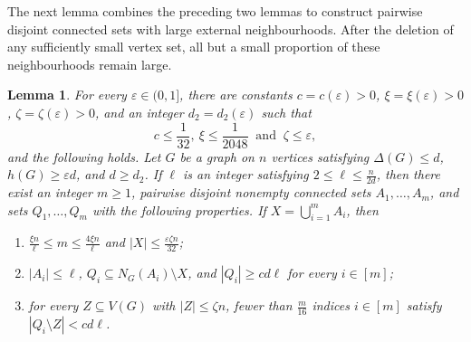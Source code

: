 \documentclass[11pt,a4paper]{article}
\newtheorem{lemma}[theorem]{Lemma}
\theoremstyle{definition}
\theoremstyle{remark}
\newcommand{\eps}{\varepsilon}
\begin{document}
The next lemma  combines the preceding two lemmas to construct pairwise disjoint connected sets with large external neighbourhoods.
After the deletion of any sufficiently small vertex set, all but a small proportion of these neighbourhoods remain large.

\begin{lemma}\label{lem:stable-branches}
For every $\eps\in(0,1]$, there are constants
$c=c(\eps)>0$, $\xi=\xi(\eps)>0$, $\zeta=\zeta(\eps)>0$, and an
integer $d_2=d_2(\eps)$ such that 
\[
c\le\frac{1}{32}, \
\xi\le\frac{1}{2048}\ \text{ and } \ \zeta\le\eps,
\]
and
the following holds. Let $G$ be a
graph on $n$ vertices satisfying $\Delta(G)\le d$,
$h(G)\ge\eps d$, and $d\ge d_2$. If $\ell$ is an integer satisfying
$2\le\ell\le\frac{n}{2d}$, then there exist an integer $m\ge1$, pairwise
disjoint nonempty connected sets $A_1,\ldots,A_m$, and sets
$Q_1,\ldots,Q_m$ with the following properties. If
$X=\bigcup_{i=1}^mA_i$, then
\begin{enumerate}[label=\textup{(\roman*)}]
 \item $\frac{\xi n}{\ell}\le m\le\frac{4\xi n}{\ell}$ and
       $|X|\le\frac{\eps\zeta n}{32}$;
 \item $|A_i|\le\ell$, $Q_i\subseteq N_G(A_i)\setminus X$, and
       $|Q_i|\ge cd\ell$ for every $i\in[m]$;
 \item for every $Z\subseteq V(G)$ with $|Z|\le\zeta n$, fewer than
       $\frac{m}{16}$ indices $i\in[m]$ satisfy
       $|Q_i\setminus Z|<cd\ell$.
\end{enumerate}

\end{lemma}
\end{document}
